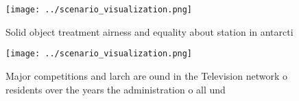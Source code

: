 \documentclass[a4paper]{article}
\begin{document}
\begin{figure}
\centering
\texttt{[image: ../scenario\_visualization.png]}
\caption{Solid object treatment airness and equality about station in antarcti
}
\end{figure}
 
\begin{figure}
\centering
\texttt{[image: ../scenario\_visualization.png]}
\caption{Major competitions and larch are ound in the Television network o residents over the years the administration o all und
}
\end{figure}
 
\end{document}
